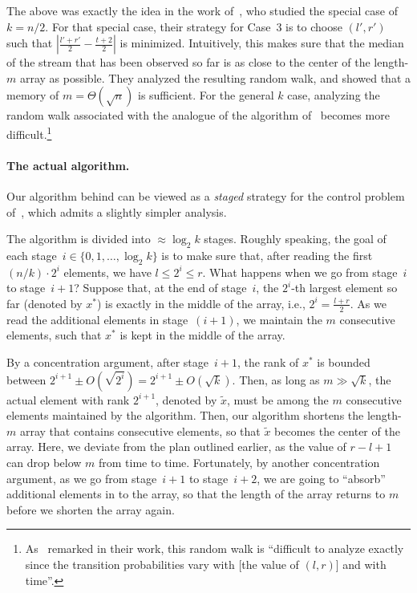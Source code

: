 The above was exactly the idea in the work of~\cite{MP80}, who studied the special case of $k = n/2$. For that special case, their strategy for Case~3 is to choose $(l', r')$ such that $\left|\frac{l' + r'}{2} - \frac{t + 2}{2}\right|$ is minimized. Intuitively, this makes sure that the median of the stream that has been observed so far is as close to the center of the length-$m$ array as possible. They analyzed the resulting random walk, and showed that  a memory of $m = \Theta(\sqrt{n})$ is sufficient. For the general $k$ case, analyzing the random walk associated with the analogue of the algorithm of~\cite{MP80} becomes more difficult.\footnote{As~\cite{MP80} remarked in their work, this random walk is ``difficult to analyze exactly since the transition probabilities vary with [the value of $(l, r)$] and with time''.}

\paragraph{The actual algorithm.} Our algorithm behind  can be viewed as a \emph{staged} strategy for the control problem of~\cite{MP80}, which admits a slightly simpler analysis.

The algorithm is divided into $\approx \log_2 k$ stages. Roughly speaking, the goal of each stage~$i \in \{0, 1, \ldots, \log_2 k\}$ is to make sure that, after reading the first $(n/k)\cdot 2^i$ elements, we have $l \le 2^i \le r$. What happens when we go from stage~$i$ to stage~$i+1$? Suppose that, at the end of stage~$i$, the $2^i$-th largest element so far (denoted by $x^*$) is exactly in the middle of the array, i.e., $2^i = \frac{l + r}{2}$. As we read the additional elements in stage~$(i+1)$, we maintain the $m$ consecutive elements, such that $x^*$ is kept in the middle of the array.

By a concentration argument, after stage~$i+1$, the rank of $x^*$ is bounded between $2^{i+1} \pm O(\sqrt{2^i}) = 2^{i+1} \pm O(\sqrt{k})$. Then, as long as $m \gg \sqrt{k}$, the actual element with rank $2^{i+1}$, denoted by $\tilde x$, must be among the $m$ consecutive elements maintained by the algorithm. Then, our algorithm shortens the length-$m$ array that contains consecutive elements, so that $\tilde x$ becomes the center of the array. Here, we deviate from the plan outlined earlier, as the value of $r - l + 1$ can drop below $m$ from time to time. Fortunately, by another concentration argument, as we go from stage~$i+1$ to stage~$i+2$, we are going to ``absorb'' additional elements in to the array, so that the length of the array returns to $m$ before we shorten the array again.

